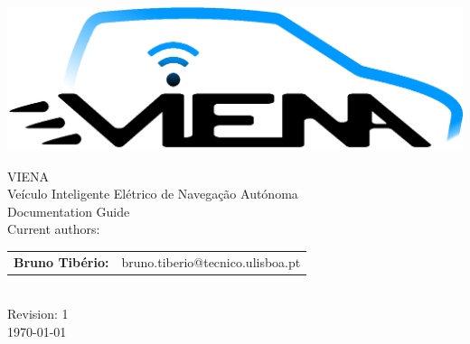 \begin{center}
%
\vspace{3cm}
\includegraphics[width=0.7\linewidth]{figures/VIENA-Logo.eps}

\vspace{1.0cm}
{\FontLb VIENA} \\ {\FontMn Veículo Inteligente Elétrico de Navegação Autónoma}\\ %
\vspace{0.2cm}
{\FontMn Documentation Guide} \\
\vfill
{\FontMb Current authors:}\\
\begin{tabular}{cl}
	\textbf{Bruno Tibério:} & bruno.tiberio@tecnico.ulisboa.pt \hfill         \\
\end{tabular} 
\\
\vfill
{\FontMb Revision: 1}\\
\vspace{0.5cm}
{\FontMb \today} \\
%
\end{center}
